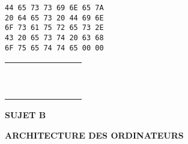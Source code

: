 \documentclass[11pt,a4paper]{article}
\newcommand{\TitreMatiere}{Architecture des Ordinateurs}
\begin{document}
\medskip

\begin{table}[ht!]
  \centering
  \begin{minipage}{0.4\textwidth}
    \centering
\begin{lstlisting}[style=algorithmique]
44 65 73 73 69 6E 65 7A
20 64 65 73 20 44 69 6E
6F 73 61 75 72 65 73 2E
43 20 65 73 74 20 63 68
6F 75 65 74 74 65 00 00
\end{lstlisting}
  \end{minipage}
  \hfillx
  \begin{minipage}{0.45\textwidth}
    \centering

%
%
%
%
%
%
%

\begin{tabular}{ | m{0.45cm} | m{0.45cm} | m{0.45cm} | m{0.45cm}   |   m{0.45cm} | m{0.45cm} | m{0.45cm} | m{0.45cm} | }
\hline
 & & &   &   & & & \\
 & & &   &   & & & \\
\hline
 & & &   &   & & & \\
 & & &   &   & & & \\
\hline
 & & &   &   & & & \\
 & & &   &   & & & \\
\hline
 & & &   &   & & & \\
 & & &   &   & & & \\
\hline
 & & &   &   & & & \\
 & & &   &   & & & \\
\hline
\end{tabular}

  \end{minipage}
\end{table}



%
%

\newpage



\vfillFirst

\begin{center}

\begin{LARGE}
\textbf{SUJET B}

\bigskip

\textbf{\MakeUppercase{\TitreMatiere}}
\end{LARGE}

\end{center}

\vfillLast
\end{document}

